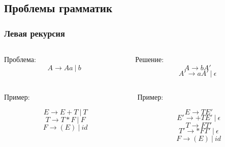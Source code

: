 \documentclass{../../slides-style}
\begin{document}
    \subsection{Проблемы грамматик}

    \begin{frame}
        \frametitle{Левая рекурсия}
        \begin{columns}[t]
            \begin{column}{0.5\textwidth}
                Проблема:
                $$A \rightarrow Aa\ |\ b$$
            \end{column}
            \begin{column}{0.5\textwidth}
                Решение: 
                $$A \rightarrow bA'$$
                $$A' \rightarrow aA'\ |\ \epsilon$$
            \end{column}
        \end{columns}
        \begin{columns}[t]
            \begin{column}{0.5\textwidth}
                Пример:
                
                $$E \rightarrow E + T\ |\ T$$
                $$T \rightarrow T * F\ |\ F$$
                $$F \rightarrow (E)\ |\ id$$
            \end{column}
            \begin{column}{0.5\textwidth}
                Пример:

                $$E \rightarrow TE'$$
                $$E' \rightarrow +TE'\ |\ \epsilon$$
                $$T \rightarrow FT'$$
                $$T' \rightarrow *FT'\ |\ \epsilon$$
                $$F \rightarrow (E)\ |\ id$$
            \end{column}
        \end{columns}
    \end{frame}
\end{document}
